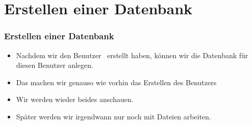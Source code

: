 \documentclass[aspectratio=169,mathserif,notheorems]{beamer}%
\begin{document}
\section{Erstellen einer Datenbank}
%
\begin{frame}%
\frametitle{Erstellen einer Datenbank}%
\begin{itemize}%
\item Nachdem wir den Benutzer~ erstellt haben, können wir die Datenbank  für diesen Benutzer anlegen.%
\item<2-> Das machen wir genauso wie vorhin das Erstellen des Benutzers%
\item<5-> Wir werden wieder beides anschauen.%
\item<6-> Später werden wir irgendwann nur noch mit Dateien arbeiten.%
\end{itemize}%
\end{frame}%
%
\end{document}
